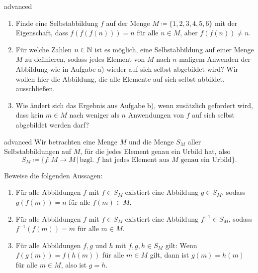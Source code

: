 \documentclass[../funktionen.tex]{subfiles}
\begin{document}
\begin{exercise}{advanced}
    \begin{enumerate}
        \item Finde eine Selbstabbildung $f$ auf der Menge $M\coloneqq\{1,2,3,4,5,6\}$ mit der Eigenschaft, dass $f(f(f(n)))=n$ für alle $n\in M$, aber $f(f(n))\neq n$.
        \item Für welche Zahlen $n\in\mathbb{N}$ ist es möglich, eine Selbstabbildung auf einer Menge $M$ zu definieren, sodass jedes Element von $M$ nach $n$-maligem Anwenden der Abbildung wie in Aufgabe a) wieder auf sich selbst abgebildet wird? Wir wollen hier die Abbildung, die alle Elemente auf sich selbst abbildet, ausschließen.
        \item Wie ändert sich das Ergebnis aus Aufgabe b), wenn zusätzlich gefordert wird, dass kein $m\in M$ nach weniger als $n$ Anwendungen von $f$ auf sich selbst abgebildet werden darf?
    \end{enumerate}
\end{exercise}

\begin{exercise}{advanced}
    Wir betrachten eine Menge $M$ und die Menge $S_M$ aller Selbstabbildungen auf $M$, für die jedes Element genau ein Urbild hat, also \[S_M\coloneqq\{f\colon M\rightarrow M\,|\,\text{bzgl. $f$ hat jedes Element aus $M$ genau ein Urbild}\}.\]
    
    Beweise die folgenden Aussagen:
    \begin{enumerate}
        \item Für alle Abbildungen $f$ mit $f\in S_M$ existiert eine Abbildung $g\in S_M$, sodass \mbox{$g(f(m))=n$} für alle $f(m)\in M$.
        \item Für alle Abbildungen $f$ mit $f\in S_M$ existiert eine Abbildung $f^{-1}\in S_M$, sodass $f^{-1}(f(m))=m$ für alle $m\in M$.
        \item Für alle Abbildungen $f,g$ und $h$ mit $f,g,h\in S_M$ gilt: Wenn $f(g(m))=f(h(m))$ für alle $m\in M$ gilt, dann ist $g(m)=h(m)$ für alle $m\in M$, also ist $g=h$.
    \end{enumerate}
\end{exercise}
\end{document}
